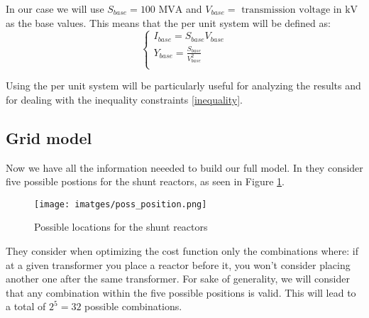 \documentclass[a4paper,11pt, titlepage, twoside]{article}
\begin{document}
In our case we will use $S_{base} =100 \text{ MVA}$ and $V_{base} = \text{ transmission voltage in kV}$ as the base values. This means that the per unit system will be defined as:
\begin{equation}
    \begin{cases}
        I_{base} = S_{base}V_{base} \\
        Y_{base} = \frac{S_{base}}{V_{base}^2} \\
    \end{cases}
\end{equation}

Using the per unit system will be particularly useful for analyzing the results and for dealing with the inequality constraints \ref{inequality}.

\subsection{Grid model}

Now we have all the information neeeded to build our full model. In \cite{paperbase} they consider five possible postions for the shunt reactors, as seen in Figure \ref{fig:poss_position}. 
\begin{figure}[H]
    \centering
	\texttt{[image: imatges/poss\_position.png]}
	\caption{Possible locations for the shunt reactors \cite{paperbase}}
    \label{fig:poss_position}
\end{figure}



They consider when optimizing the cost function only the combinations where: if at a given transformer you place a reactor before it, you won't consider placing another one
after the same transformer. For sake of generality, we will consider that any combination within the five possible positions is valid. This will lead to a total of $2^5 = 32$ possible combinations.
\end{document}
